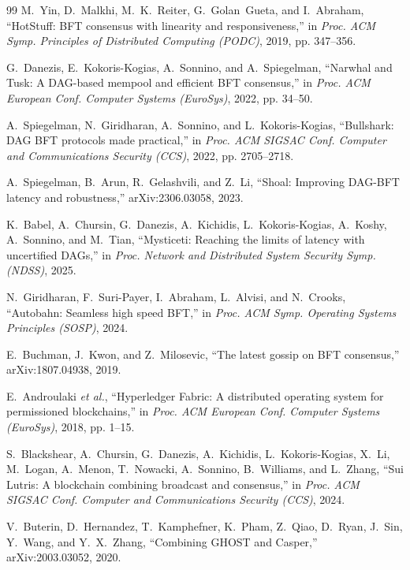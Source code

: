 \documentclass[journal]{IEEEtran}
\theoremstyle{definition}
\theoremstyle{remark}
\begin{document}
\begin{thebibliography}{99}
 M.~Yin, D.~Malkhi, M.~K.~Reiter, G.~Golan~Gueta, and I.~Abraham,
``HotStuff: BFT consensus with linearity and responsiveness,'' in \emph{Proc. ACM Symp.
Principles of Distributed Computing (PODC)}, 2019, pp. 347--356.

 G.~Danezis, E.~Kokoris-Kogias, A.~Sonnino, and A.~Spiegelman, ``Narwhal and
Tusk: A DAG-based mempool and efficient BFT consensus,'' in \emph{Proc. ACM European Conf.
Computer Systems (EuroSys)}, 2022, pp. 34--50.

 A.~Spiegelman, N.~Giridharan, A.~Sonnino, and L.~Kokoris-Kogias,
``Bullshark: DAG BFT protocols made practical,'' in \emph{Proc. ACM SIGSAC Conf. Computer and
Communications Security (CCS)}, 2022, pp. 2705--2718.

 A.~Spiegelman, B.~Arun, R.~Gelashvili, and Z.~Li, ``Shoal: Improving DAG-BFT
latency and robustness,'' arXiv:2306.03058, 2023.

 K.~Babel, A.~Chursin, G.~Danezis, A.~Kichidis, L.~Kokoris-Kogias, A.~Koshy,
A.~Sonnino, and M.~Tian, ``Mysticeti: Reaching the limits of latency with uncertified DAGs,'' in
\emph{Proc. Network and Distributed System Security Symp. (NDSS)}, 2025.

 N.~Giridharan, F.~Suri-Payer, I.~Abraham, L.~Alvisi, and N.~Crooks,
``Autobahn: Seamless high speed BFT,'' in \emph{Proc. ACM Symp. Operating Systems Principles
(SOSP)}, 2024.

 E.~Buchman, J.~Kwon, and Z.~Milosevic, ``The latest gossip on BFT
consensus,'' arXiv:1807.04938, 2019.

 E.~Androulaki \emph{et al.}, ``Hyperledger Fabric: A distributed operating
system for permissioned blockchains,'' in \emph{Proc. ACM European Conf. Computer Systems
(EuroSys)}, 2018, pp. 1--15.

 S.~Blackshear, A.~Chursin, G.~Danezis, A.~Kichidis, L.~Kokoris-Kogias, X.~Li,
M.~Logan, A.~Menon, T.~Nowacki, A.~Sonnino, B.~Williams, and L.~Zhang, ``Sui Lutris: A blockchain
combining broadcast and consensus,'' in \emph{Proc. ACM SIGSAC Conf. Computer and Communications
Security (CCS)}, 2024.

 V.~Buterin, D.~Hernandez, T.~Kamphefner, K.~Pham, Z.~Qiao, D.~Ryan, J.~Sin,
Y.~Wang, and Y.~X.~Zhang, ``Combining GHOST and Casper,'' arXiv:2003.03052, 2020.


\end{thebibliography}
\end{document}
